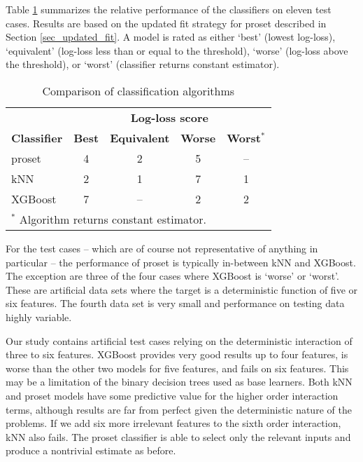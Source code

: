Table \ref{tab_classifier_comparison} summarizes the relative performance of the classifiers on eleven test cases.
Results are based on the updated fit strategy for proset described in Section \ref{sec_updated_fit}.
A model is rated as either `best' (lowest log-loss), `equivalent' (log-loss less than or equal to the threshold), `worse' (log-loss above the threshold), or `worst' (classifier returns constant estimator).
\par
%
\begin{table}
\caption{Comparison of classification algorithms}
\label{tab_classifier_comparison}
%
\begin{center}
\begin{tabular}{|lcccc|}
\hline
&\multicolumn{4}{c|}{\textbf{Log-loss score}}\\
\textbf{Classifier}&\textbf{Best}&\textbf{Equivalent}&\textbf{Worse}&\textbf{Worst$^*$}\\
proset&4&2&5&--\\
kNN&2&1&7&1\\
XGBoost&7&--&2&2\\
\multicolumn{5}{|l|}{$^*$ Algorithm returns constant estimator.}\\
\hline
\end{tabular}
\end{center}
\end{table}
%
For the test cases -- which are of course not representative of anything in particular -- the performance of proset is typically in-between kNN and XGBoost.
The exception are three of the four cases where XGBoost is `worse' or `worst'.
These are artificial data sets where the target is a deterministic function of five or six features.
The fourth data set is very small and performance on testing data highly variable.\par
%
Our study contains artificial test cases relying on the deterministic interaction of three to six features.
XGBoost provides very good results up to four features, is worse than the other two models for five features, and fails on six features.
This may be a limitation of the binary decision trees used as base learners.
Both kNN and proset models have some predictive value for the higher order interaction terms, although results are far from perfect given the deterministic nature of the problems.
If we add six more irrelevant features to the sixth order interaction, kNN also fails.
The proset classifier is able to select only the relevant inputs and produce a nontrivial estimate as before.\par
